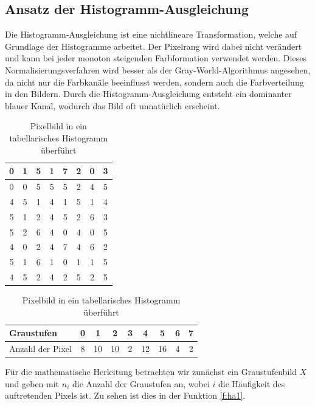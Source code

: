   \subsection{Ansatz der Histogramm-Ausgleichung}\label{s.ha}  
Die Histogramm-Ausgleichung \cite{goatman2003colour} ist eine nichtlineare Transformation, welche auf Grundlage der Histogramme arbeitet. Der Pixelrang wird dabei nicht verändert und kann bei jeder monoton steigenden Farbformation verwendet werden. Dieses Normalisierungsverfahren wird besser als der Gray-World-Algorithmus angesehen, da nicht nur die Farbkanäle beeinflusst werden, sondern auch die Farbverteilung in den Bildern. Durch die Histogramm-Ausgleichung entsteht ein dominanter blauer Kanal, wodurch das Bild oft unnatürlich erscheint.
   \begin{table}
  [h]
  \centering
  \caption{Pixelbild in ein tabellarisches Histogramm überführt}
  \label{tab:bildha}
  \begin{minipage}{\textwidth}
  \center
  \begin{tabular}{|c|c|c|c|c|c|c|c|}
  \hline
  0&1&5&1&7&2&0&3\\
  \hline
  0&0&5&5&5&2&4&5\\
  \hline
  4&5&1&4&1&5&1&4\\
  \hline
  5&1&2&4&5&2&6&3\\
  \hline
  5&2&6&4&0&4&0&5\\
  \hline
  4&0&2&4&7&4&6&2\\
  \hline
  5&1&6&1&0&1&1&5\\
  \hline
  4&5&2&4&2&5&2&5\\
  \hline
  \end{tabular}
  \end{minipage}
  \begin{minipage}{\textwidth}
  \hspace{\textwidth}
  \end{minipage}
  \begin{minipage}{\textwidth}
  \center
  \begin{tabular}{|l|c|c|c|c|c|c|c|c|}
  \hline
  Graustufen & 0 & 1 & 2 & 3 & 4 & 5 & 6 & 7\\
  \hline
  Anzahl der Pixel & 8 & 10 & 10 & 2 & 12 & 16 & 4 & 2\\
  \hline
  \end{tabular}
  \end{minipage}
  \end{table}
Für die mathematische Herleitung betrachten wir zunächst ein Graustufenbild $X$ und geben mit $n_{i}$ die Anzahl der Graustufen an, wobei $i$ die Häufigkeit des auftretenden Pixels ist. Zu sehen ist dies in der Funktion \ref{f:ha1}.

